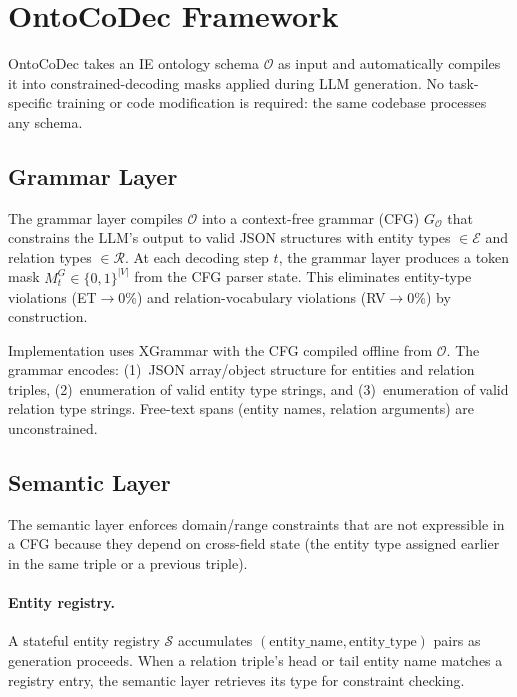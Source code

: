 \documentclass[11pt,a4paper]{article}
\newcommand{\sys}{OntoCoDec\xspace}
\begin{document}
\section{OntoCoDec Framework}
\label{sec:method}

\sys takes an IE ontology schema $\mathcal{O}$ as input and automatically compiles it into constrained-decoding masks applied during LLM generation.
No task-specific training or code modification is required: the same codebase processes any schema.

\subsection{Grammar Layer}

The grammar layer compiles $\mathcal{O}$ into a context-free grammar (CFG) $G_\mathcal{O}$ that constrains the LLM's output to valid JSON structures with entity types $\in \mathcal{E}$ and relation types $\in \mathcal{R}$.
At each decoding step $t$, the grammar layer produces a token mask $M_t^G \in \{0,1\}^{|V|}$ from the CFG parser state.
This eliminates entity-type violations (ET$\to$0\%) and relation-vocabulary violations (RV$\to$0\%) by construction.

Implementation uses XGrammar with the CFG compiled offline from $\mathcal{O}$.
The grammar encodes: (1)~JSON array/object structure for entities and relation triples, (2)~enumeration of valid entity type strings, and (3)~enumeration of valid relation type strings.
Free-text spans (entity names, relation arguments) are unconstrained.

\subsection{Semantic Layer}

The semantic layer enforces domain/range constraints that are not expressible in a CFG because they depend on cross-field state (the entity type assigned earlier in the same triple or a previous triple).

\paragraph{Entity registry.}
A stateful entity registry $\mathcal{S}$ accumulates $(\text{entity\_name}, \text{entity\_type})$ pairs as generation proceeds.
When a relation triple's head or tail entity name matches a registry entry, the semantic layer retrieves its type for constraint checking.
\end{document}
